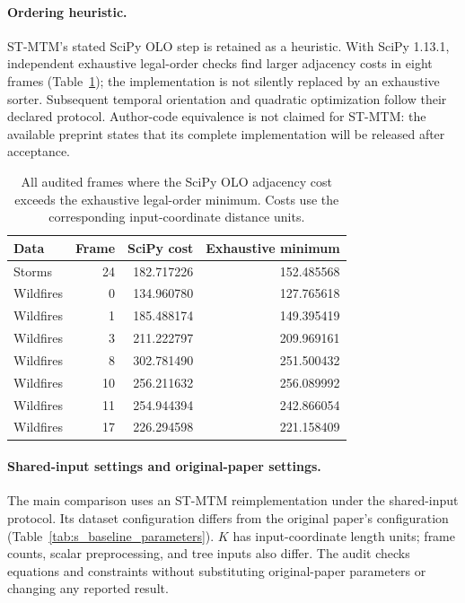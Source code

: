 \paragraph{Ordering heuristic.} ST-MTM's stated SciPy OLO step is retained as a heuristic. With SciPy 1.13.1, independent exhaustive legal-order checks find larger adjacency costs in eight frames (Table~\ref{tab:s_olo_gaps}); the implementation is not silently replaced by an exhaustive sorter. Subsequent temporal orientation and quadratic optimization follow their declared protocol. Author-code equivalence is not claimed for ST-MTM: the available preprint states that its complete implementation will be released after acceptance.

\begin{table}[H]\centering\small
\caption{All audited frames where the SciPy OLO adjacency cost exceeds the exhaustive legal-order minimum. Costs use the corresponding input-coordinate distance units.}\label{tab:s_olo_gaps}
\begin{tabular}{lrrr}\toprule
Data & Frame & SciPy cost & Exhaustive minimum\\\midrule
Storms & 24 & 182.717226 & 152.485568\\
Wildfires & 0 & 134.960780 & 127.765618\\
Wildfires & 1 & 185.488174 & 149.395419\\
Wildfires & 3 & 211.222797 & 209.969161\\
Wildfires & 8 & 302.781490 & 251.500432\\
Wildfires & 10 & 256.211632 & 256.089992\\
Wildfires & 11 & 254.944394 & 242.866054\\
Wildfires & 17 & 226.294598 & 221.158409\\
\bottomrule\end{tabular}\end{table}

\paragraph{Shared-input settings and original-paper settings.} The main comparison uses an ST-MTM reimplementation under the shared-input protocol. Its dataset configuration differs from the original paper's configuration (Table~\ref{tab:s_baseline_parameters}). $K$ has input-coordinate length units; frame counts, scalar preprocessing, and tree inputs also differ. The audit checks equations and constraints without substituting original-paper parameters or changing any reported result.

